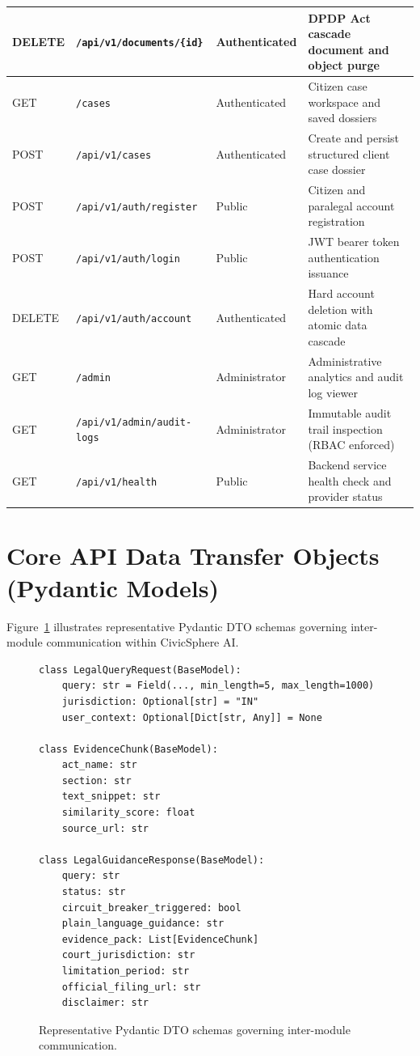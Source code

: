 \begin{table}[H]
{\begin{tabular}{|l|l|l|p{5cm}|}
DELETE & \texttt{/api/v1/documents/\{id\}} & Authenticated & DPDP Act cascade document and object purge \\ \hline
GET & \texttt{/cases} & Authenticated & Citizen case workspace and saved dossiers \\ \hline
POST & \texttt{/api/v1/cases} & Authenticated & Create and persist structured client case dossier \\ \hline
POST & \texttt{/api/v1/auth/register} & Public & Citizen and paralegal account registration \\ \hline
POST & \texttt{/api/v1/auth/login} & Public & JWT bearer token authentication issuance \\ \hline
DELETE & \texttt{/api/v1/auth/account} & Authenticated & Hard account deletion with atomic data cascade \\ \hline
GET & \texttt{/admin} & Administrator & Administrative analytics and audit log viewer \\ \hline
GET & \texttt{/api/v1/admin/audit-logs} & Administrator & Immutable audit trail inspection (RBAC enforced) \\ \hline
GET & \texttt{/api/v1/health} & Public & Backend service health check and provider status \\ \hline
\end{tabular}%
}
\end{table}

\section{Core API Data Transfer Objects (Pydantic Models)}
\label{sec:app_dtos}
Figure~\ref{fig:pydantic_models} illustrates representative Pydantic DTO schemas governing inter-module communication within CivicSphere AI.

\begin{figure}[H]
\label{fig:pydantic_models}
\begin{verbatim}
class LegalQueryRequest(BaseModel):
    query: str = Field(..., min_length=5, max_length=1000)
    jurisdiction: Optional[str] = "IN"
    user_context: Optional[Dict[str, Any]] = None

class EvidenceChunk(BaseModel):
    act_name: str
    section: str
    text_snippet: str
    similarity_score: float
    source_url: str

class LegalGuidanceResponse(BaseModel):
    query: str
    status: str
    circuit_breaker_triggered: bool
    plain_language_guidance: str
    evidence_pack: List[EvidenceChunk]
    court_jurisdiction: str
    limitation_period: str
    official_filing_url: str
    disclaimer: str
\end{verbatim}
\caption{Representative Pydantic DTO schemas governing inter-module communication.}
\end{figure}

